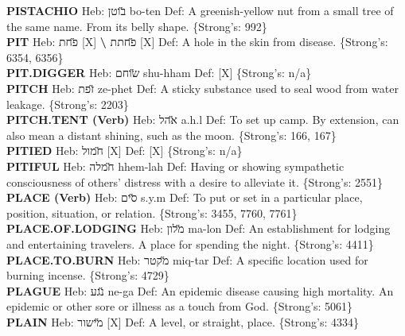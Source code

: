 {\textbf{PISTACHIO} Heb: {\large\H בוטן} bo-ten Def: A greenish-yellow nut from a small tree of the same name. From its belly shape. \{Strong's: 992\}\hfill{}\\

\textbf{PIT} Heb: {\large\H פחת} {[}X{]} \textbf{\textbackslash{}} {\large\H פחתת} {[}X{]} Def: A hole in the skin from disease. \{Strong's: 6354, 6356\}\hfill{}\\

\textbf{PIT.DIGGER} Heb: {\large\H שוחם} shu-hham Def: {[}X{]} \{Strong's: n/a\}\hfill{}\\

\textbf{PITCH} Heb: {\large\H זפת} ze-phet Def: A sticky substance used to seal wood from water leakage. \{Strong's: 2203\}\hfill{}\\

\textbf{PITCH.TENT (Verb)} Heb: {\large\H אהל} a.h.l Def: To set up camp. By extension, can also mean a distant shining, such as the moon. \{Strong's: 166, 167\}\hfill{}\\

\textbf{PITIED} Heb: {\large\H חמול} {[}X{]} Def: {[}X{]} \{Strong's: n/a\}\hfill{}\\

\textbf{PITIFUL} Heb: {\large\H חמלה} hhem-lah Def: Having or showing sympathetic consciousness of others’ distress with a desire to alleviate it. \{Strong's: 2551\}\hfill{}\\

\textbf{PLACE (Verb)} Heb: {\large\H סים} s.y.m Def: To put or set in a particular place, position, situation, or relation. \{Strong's: 3455, 7760, 7761\}\hfill{}\\

\textbf{PLACE.OF.LODGING} Heb: {\large\H מלון} ma-lon Def: An establishment for lodging and entertaining travelers. A place for spending the night. \{Strong's: 4411\}\hfill{}\\

\textbf{PLACE.TO.BURN} Heb: {\large\H מקטר} miq-tar Def: A specific location used for burning incense. \{Strong's: 4729\}\hfill{}\\

\textbf{PLAGUE} Heb: {\large\H נגע} ne-ga Def: An epidemic disease causing high mortality. An epidemic or other sore or illness as a touch from God. \{Strong's: 5061\}\hfill{}\\

\textbf{PLAIN} Heb: {\large\H מישור} {[}X{]} Def: A level, or straight, place. \{Strong's: 4334\}\hfill{}\\

}
